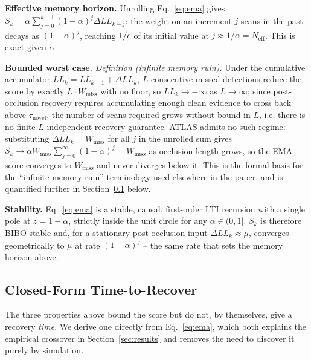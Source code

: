 \documentclass[conference]{IEEEtran}
\begin{document}
\textbf{Effective memory horizon.} Unrolling Eq.~\eqref{eq:ema} gives $S_k = \alpha \sum_{j=0}^{k-1} (1-\alpha)^j \Delta LL_{k-j}$: the weight on an increment $j$ scans in the past decays as $(1-\alpha)^j$, reaching $1/e$ of its initial value at $j \approx 1/\alpha = N_{\text{eff}}$. This is exact given $\alpha$.

\textbf{Bounded worst case.} \textit{Definition (infinite memory ruin).} Under the cumulative accumulator $LL_k = LL_{k-1} + \Delta LL_k$, $L$ consecutive missed detections reduce the score by exactly $L \cdot W_{\text{miss}}$ with no floor, so $LL_k \to -\infty$ as $L \to \infty$; since post-occlusion recovery requires accumulating enough clean evidence to cross back above $\tau_{\text{novel}}$, the number of scans required grows without bound in $L$, i.e. there is no finite-$L$-independent recovery guarantee. ATLAS admits no such regime: substituting $\Delta LL_k = W_{\text{miss}}$ for all $j$ in the unrolled sum gives $S_k \to \alpha W_{\text{miss}} \sum_{j=0}^{\infty} (1-\alpha)^j = W_{\text{miss}}$ as occlusion length grows, so the EMA score converges to $W_{\text{miss}}$ and never diverges below it. This is the formal basis for the ``infinite memory ruin'' terminology used elsewhere in the paper, and is quantified further in Section~\ref{sec:derivation} below.

\textbf{Stability.} Eq.~\eqref{eq:ema} is a stable, causal, first-order LTI recursion with a single pole at $z=1-\alpha$, strictly inside the unit circle for any $\alpha \in (0,1]$. $S_k$ is therefore BIBO stable and, for a stationary post-occlusion input $\Delta LL_k \approx \mu$, converges geometrically to $\mu$ at rate $(1-\alpha)^j$ -- the same rate that sets the memory horizon above.

\subsection{Closed-Form Time-to-Recover}
\label{sec:derivation}
The three properties above bound the score but do not, by themselves, give a recovery \emph{time}. We derive one directly from Eq.~\eqref{eq:ema}, which both explains the empirical crossover in Section~\ref{sec:results} and removes the need to discover it purely by simulation.
\end{document}
